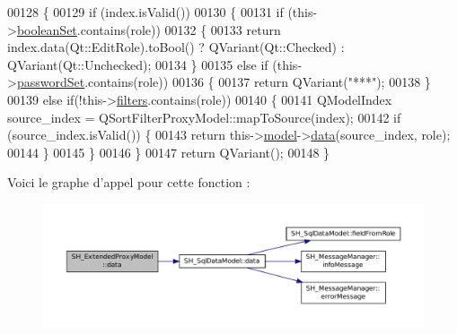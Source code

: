 \begin{DoxyCode}
00128 \{
00129     \textcolor{keywordflow}{if} (index.isValid())
00130     \{
00131         \textcolor{keywordflow}{if} (this->\hyperlink{classSH__ExtendedProxyModel_a7dd9cf1dd153b98220d217e9be1f0916}{booleanSet}.contains(role))
00132         \{
00133             \textcolor{keywordflow}{return} index.data(Qt::EditRole).toBool() ? QVariant(Qt::Checked) : QVariant(Qt::Unchecked);
00134         \}
00135         \textcolor{keywordflow}{else} \textcolor{keywordflow}{if} (this->\hyperlink{classSH__ExtendedProxyModel_a9616e7be442b560e260e1db9034143bc}{passwordSet}.contains(role))
00136         \{
00137             \textcolor{keywordflow}{return} QVariant(\textcolor{stringliteral}{"***"});
00138         \}
00139         \textcolor{keywordflow}{else} \textcolor{keywordflow}{if}(!this->\hyperlink{classSH__ExtendedProxyModel_a99a5c4c6b9d125c87f048c76d22278d3}{filters}.contains(role))
00140         \{
00141             QModelIndex source\_index = QSortFilterProxyModel::mapToSource(index);
00142             \textcolor{keywordflow}{if} (source\_index.isValid()) \{
00143                 \textcolor{keywordflow}{return} this->\hyperlink{classSH__ExtendedProxyModel_a8c8b8930c6b1abd9bbb1dce1fdc9690b}{model}->\hyperlink{classSH__SqlDataModel_a30cc763618d73a1bb5410c84812c0b9f}{data}(source\_index, role);
00144             \}
00145         \}
00146     \}
00147     \textcolor{keywordflow}{return} QVariant();
00148 \}
\end{DoxyCode}


Voici le graphe d'appel pour cette fonction \-:
\nopagebreak
\begin{figure}[H]
\begin{center}
\leavevmode
\includegraphics[width=350pt]{classSH__ExtendedProxyModel_afbc947efbe1107fc5bf8926c52902a1c_cgraph}
\end{center}
\end{figure}


